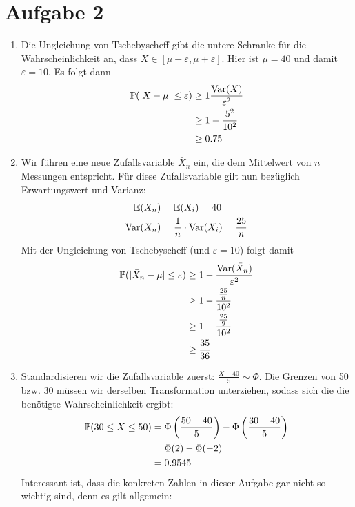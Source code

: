 \documentclass{article}
\newcommand{\E}{\mathbb{E}}
\DeclareMathOperator{\Var}{Var}
\begin{document}
	\section*{Aufgabe 2}
	\begin{enumerate}[label=(\alph*)]
		\item Die Ungleichung von Tschebyscheff gibt die untere Schranke für die Wahrscheinlichkeit an, dass $X\in [\mu-\varepsilon,\mu+\varepsilon]$. Hier ist $\mu=40$ und damit $\varepsilon=10$. Es folgt dann
		\begin{align}
			\mathbb{P}(\vert X-\mu\vert \le \varepsilon) &\ge 1\frac{\Var(X)}{\varepsilon^2} \notag \\
			&\ge 1- \frac{5^2}{10^2} \notag \\
			&\ge 0.75 \notag
		\end{align}
		\item Wir führen eine neue Zufallsvariable $\bar{X}_n$ ein, die dem Mittelwert von $n$ Messungen entspricht. Für diese Zufallsvariable gilt nun bezüglich Erwartungswert und Varianz:
		\begin{align}
			\E(\bar{X}_n) &= \E(X_i) = 40 \notag \\
			\Var(\bar{X}_n) &= \frac{1}{n}\cdot\Var(X_i) = \frac{25}{n} \notag
		\end{align}
		Mit der Ungleichung von Tschebyscheff (und $\varepsilon=10$) folgt damit
		\begin{align}
			\mathbb{P}(\vert \bar{X}_n-\mu\vert \le \varepsilon) &\ge 1-\frac{\Var(\bar{X}_n)}{\varepsilon^2} \notag \\
			&\ge 1- \frac{\frac{25}{n}}{10^2} \notag \\
			&\ge 1- \frac{\frac{25}{9}}{10^2} \notag \\
			&\ge \frac{35}{36} \notag
		\end{align}
		\item Standardisieren wir die Zufallsvariable zuerst: $\frac{X-40}{5}\sim \Phi$. Die Grenzen von 50 bzw. 30 müssen wir derselben Transformation unterziehen, sodass sich die die benötigte Wahrscheinlichkeit ergibt:
		\begin{align}
			\mathbb{P}(30 \le X \le 50) &= \Phi\left(\frac{50-40}{5}\right) - \Phi\left(\frac{30-40}{5}\right) \notag \\
			&= \Phi(2) - \Phi(-2) \notag \\
			&= 0.9545 \notag
		\end{align}
		Interessant ist, dass die konkreten Zahlen in dieser Aufgabe gar nicht so wichtig sind, denn es gilt allgemein:
		\begin{itemize}

\end{itemize}
\end{enumerate}
\end{document}
